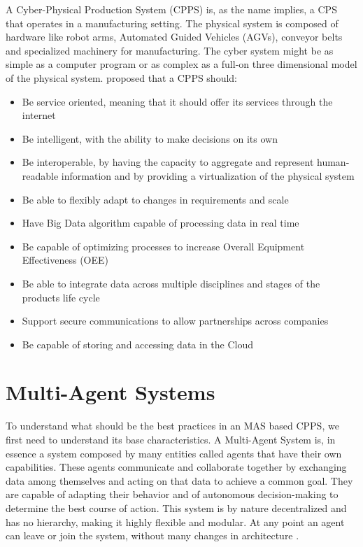 A Cyber-Physical Production System (CPPS) is, as the name implies, a CPS that operates in a manufacturing setting. The physical system is composed of hardware like robot arms, Automated Guided Vehicles (AGVs), conveyor belts and specialized machinery for manufacturing. The cyber system might be as simple as a computer program or as complex as a full-on three dimensional model of the physical system. \citeauthor{birgit01} \cite{birgit01} proposed that a CPPS should:
\begin{itemize}
	\item Be service oriented, meaning that it should offer its services through the internet
	\item Be intelligent, with the ability to make decisions on its own
	\item Be interoperable, by having the capacity to aggregate and represent human-readable information and by providing a virtualization of the physical system
	\item Be able to flexibly adapt to changes in requirements and scale
	\item Have Big Data algorithm capable of processing data in real time
	\item Be capable of optimizing processes to increase Overall Equipment Effectiveness (OEE)
	\item Be able to integrate data across multiple disciplines and stages of the products life cycle
	\item Support secure communications to allow partnerships across companies
	\item Be capable of storing and accessing data in the Cloud
\end{itemize}

\section{Multi-Agent Systems}
\label{sec:multi-agent_systems}


To understand what should be the best practices in an MAS based CPPS, we first need to understand its base characteristics. A Multi-Agent System is, in essence a system composed by many entities called agents that have their own capabilities. These agents communicate and collaborate together by exchanging data among themselves and acting on that data to achieve a common goal. They are capable of adapting their behavior and of autonomous decision-making to determine the best course of action. This system is by nature decentralized and has no hierarchy, making it highly flexible and modular. At any point an agent can leave or join the system, without many changes in architecture \cite{paulo02}.\\

